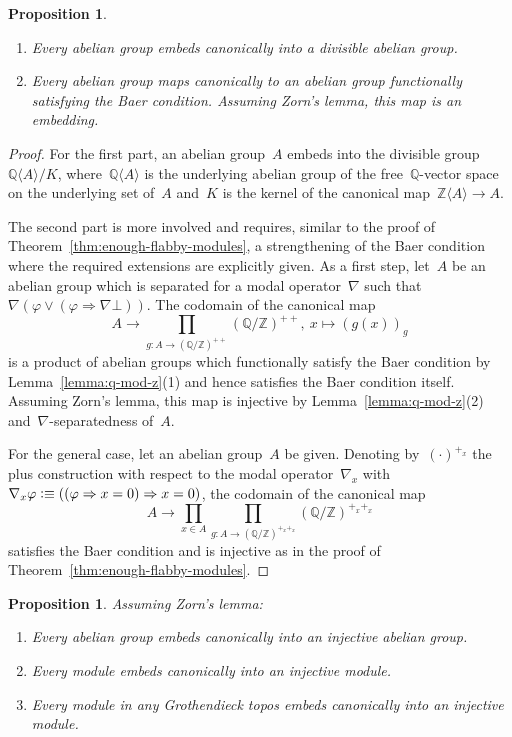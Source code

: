 \documentclass[oneside]{amsart}
\theoremstyle{definition}
\theoremstyle{plain}
\newtheorem{prop}[defn]{Proposition}
\theoremstyle{remark}
\newcommand{\ZZ}{\mathbb{Z}}
\newcommand{\QQ}{\mathbb{Q}}
\newcommand{\defeqv}{\vcentcolon\equiv}
\renewcommand{\_}{\mathpunct{.}\,}
\begin{document}
\begin{prop}\label{prop:embed2}
\begin{enumerate}
\item Every abelian group embeds canonically into a divisible abelian group.
\item Every abelian group maps canonically to an abelian group functionally satisfying the Baer
condition. Assuming Zorn's lemma, this map is an embedding.
\end{enumerate}
\end{prop}

\begin{proof}For the first part, an abelian group~$A$ embeds into the
divisible group~$\QQ\langle A \rangle / K$, where~$\QQ\langle A \rangle$ is the
underlying abelian group of the free~$\QQ$-vector space on the underlying set of~$A$ and~$K$ is the
kernel of the canonical map~$\ZZ\langle A \rangle \to A$.

The second part is more involved and requires, similar to the proof of
Theorem~\ref{thm:enough-flabby-modules}, a strengthening of the Baer condition
where the required extensions are explicitly given. As a first step, let~$A$ be
an abelian group which is separated for a modal operator~$\nabla$ such
that~$\nabla(\varphi \vee (\varphi \Rightarrow \nabla\bot))$. The codomain of
the canonical map
\[ A \longrightarrow \prod_{g : A \to (\QQ/\ZZ)^{++}} (\QQ/\ZZ)^{++},\
  x \longmapsto (g(x))_g \]
is a product of abelian groups which functionally satisfy the Baer condition by
Lemma~\ref{lemma:q-mod-z}(1) and hence satisfies the Baer condition itself.
Assuming Zorn's lemma, this map is injective by Lemma~\ref{lemma:q-mod-z}(2)
and~$\nabla$-separatedness of~$A$.

For the general case, let an abelian group~$A$ be given. Denoting
by~$(\cdot)^{+_x}$ the plus construction with respect to the modal
operator~$\nabla_x$ with~$\nabla_x\varphi \defeqv ((\varphi \Rightarrow x
= 0) \Rightarrow x = 0)$, the codomain of the canonical map
\[ A \longrightarrow \prod_{x \in A} \prod_{g : A \to (\QQ/\ZZ)^{+_x+_x}}
(\QQ/\ZZ)^{+_x+_x} \]
satisfies the Baer condition and is injective as in the proof of
Theorem~\ref{thm:enough-flabby-modules}.
\end{proof}

\begin{prop}Assuming Zorn's lemma:
\begin{enumerate}
\item Every abelian group embeds canonically into an injective abelian group.
\item Every module embeds canonically into an injective module.
\item Every module in any Grothendieck topos embeds canonically into an injective module.
\end{enumerate}
\end{prop}
\end{document}

